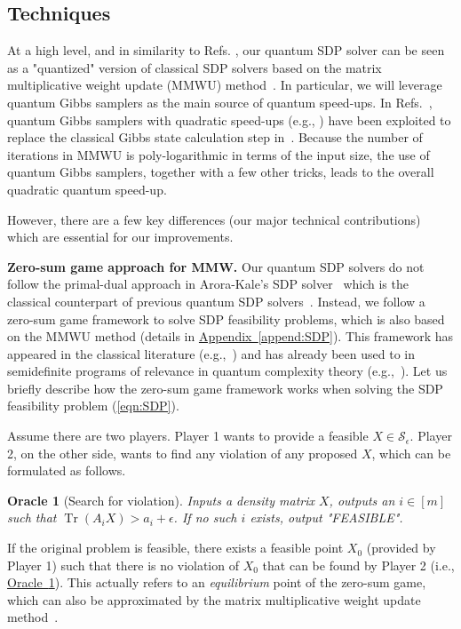 \documentclass[a4paper,UKenglish,cleveref, autoref]{lipics-v2019}
\newtheorem{oracle}{Oracle}
\theoremstyle{remark}
\numberwithin{equation}{section}
\numberwithin{oracle}{section}
\numberwithin{remark}{section}
\newcommand{\ora}[1]{\hyperref[ora:#1]{Oracle~\ref*{ora:#1}}}
\newcommand{\append}[1]{\hyperref[append:#1]{Appendix~\ref*{append:#1}}}
\newcommand{\range}[1]{[#1]}
\DeclareMathOperator{\tr}{Tr}
\newcommand{\hd}[1]{\vspace{2mm} \noindent \textbf{#1}}
\begin{document}
\subsection{Techniques}\label{sec:tech}
At a high level, and in similarity to Refs. \cite{brandao2016quantum, vanApeldoorn2017quantum}, our quantum SDP solver can be seen as a "quantized" version of classical SDP solvers based on the matrix multiplicative weight update (MMWU) method~\cite{v008a006}. In particular, we will leverage quantum Gibbs samplers as the main source of quantum speed-ups. In Refs.~\cite{brandao2016quantum, vanApeldoorn2017quantum}, quantum Gibbs samplers with quadratic speed-ups (e.g., \cite{poulin2009sampling,chowdhury2016quantum}) have been exploited to replace the classical Gibbs state calculation step in~\cite{v008a006}. Because the number of iterations in MMWU is poly-logarithmic in terms of the input size, the use of quantum Gibbs samplers, together with a few other tricks, leads to the overall quadratic quantum speed-up.

However, there are a few key differences (our major technical contributions) which are essential for our improvements.

\hd{Zero-sum game approach for MMW.} Our quantum SDP solvers do not follow the primal-dual approach in Arora-Kale's SDP solver~\cite{arora2007combinatorial} which is the classical counterpart of previous quantum SDP solvers~\cite{brandao2016quantum,vanApeldoorn2017quantum}. Instead, we follow a zero-sum game framework to solve SDP feasibility problems, which is also based on the MMWU method (details in \append{SDP}).
This framework has appeared in the classical literature (e.g.,~\cite{Hazan}) and has already been used to in semidefinite programs of relevance in quantum complexity theory (e.g.,~\cite{Wu10, gutoski2012parallel, LRS15}).
Let us briefly describe how the zero-sum game framework works when solving the SDP feasibility problem (\ref{eqn:SDP}).

Assume there are two players. Player 1 wants to provide a feasible $X \in \mathcal{S}_{\epsilon}$. Player 2, on the other side, wants to find any violation of any proposed $X$, which can be formulated as follows.
\begin{oracle}[Search for violation] \label{ora:violation-intro}
Inputs a density matrix $X$, outputs an $i\in\range{m}$ such that $\tr(A_{i} X)>a_{i}+\epsilon$. If no such $i$ exists, output "FEASIBLE".
\end{oracle}

If the original problem is feasible, there exists a feasible point $X_0$ (provided by Player 1) such that there is no violation of $X_0$ that can be found by Player 2 (i.e., \ora{violation-intro}). This actually refers to an \emph{equilibrium} point of the zero-sum game, which can also be approximated by the matrix multiplicative weight update method~\cite{v008a006}.
\end{document}
